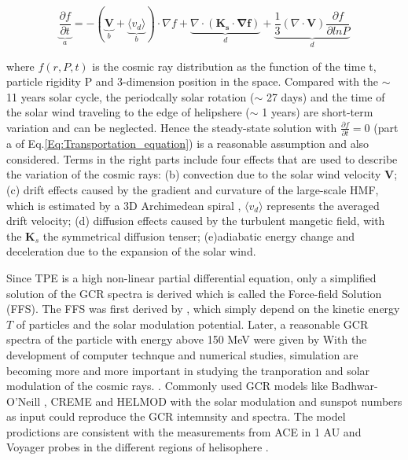 	\begin{equation}
		\underbrace{\frac{\partial f}{\partial t}}_{a} = - ( \underbrace{\boldsymbol{V}}_{b} + \underbrace{\langle v_d \rangle }_{b}) \cdot \nabla f + \underbrace{\nabla \cdot (\boldsymbol{K_s \cdot \nabla f})}_{d} + \underbrace{\frac{1}{3}(\nabla \cdot \boldsymbol{V}) \frac{\partial f}{\partial ln P}}_{d}
		\label{Eq:Transportation_equation}
	\end{equation}

where $f(r, P, t)$ is the cosmic ray distribution as the function of the time t, particle rigidity P and 3-dimension position in the space. Compared with the $\sim$ 11 years solar cycle, the periodcally solar rotation ($\sim$ 27 days) and  the time of the solar wind traveling to the edge of helipshere ($\sim$ 1 years) are short-term variation and can be neglected. Hence the steady-state solution with  $\frac{\partial f}{\partial t} = 0$ (part a of Eq.\ref{Eq:Transportation_equation}) is a reasonable assumption and also considered. Terms in the right parts include four effects that are used to describe the variation of the cosmic rays: (b) convection due to the solar wind velocity $\boldsymbol{V}$; (c) drift effects caused by the gradient and curvature of the large-scale \ac{HMF}, which is estimated by a 3D Archimedean spiral \citet{Parker-1958}, $\langle v_d \rangle$ represents the averaged drift velocity; (d) diffusion effects caused by the turbulent mangetic field, with the $\boldsymbol{K}_s$ the symmetrical diffusion tenser; (e)adiabatic energy change and deceleration due to the expansion of the solar wind. 

Since TPE is a high non-linear partial differential equation, only a simplified solution of the GCR spectra is derived which is called the Force-field Solution (FFS). The FFS was first derived by \citet{Gleeson1967ApJ, Gleeson1968ApJ}, which simply depend on the kinetic energy $T$ of particles and the solar modulation potential. Later, a reasonable GCR spectra of the particle with energy above 150 MeV were given by \citet{Gleeson1973ApSS}
With the development of computer technque and numerical studies, simulation are becoming more and more important in studying the tranporation and solar modulation of the cosmic rays. \citep{Jokipii1979ApJ, LeRoux1995ApJ, Manuel2011AdSpR, Potgieter2013LRSP, Vos2015ApJ, Vos2016SoPh,Boschini2019AdSpR, Boschini2022AdSpR, 
Corti2019ApJ, Shen2019ApJ}. 
Commonly used \ac{GCR} models like Badhwar-O'Neill \citep{Oneill2006AdSpR,ONeill2015, Slaba2020SpWea}, CREME \citep{Tylka1997ITNS,Weller2010ITNS} and HELMOD \citep{Boschini2018AdSpR} with the solar modulation and sunspot numbers as input could reproduce the GCR intemnsity and spectra. The model prodictions are consistent with the measurements from \ac{ACE} in 1 AU and Voyager probes in the different regions of helisophere \citep{Boschini2019AdSpR}.

